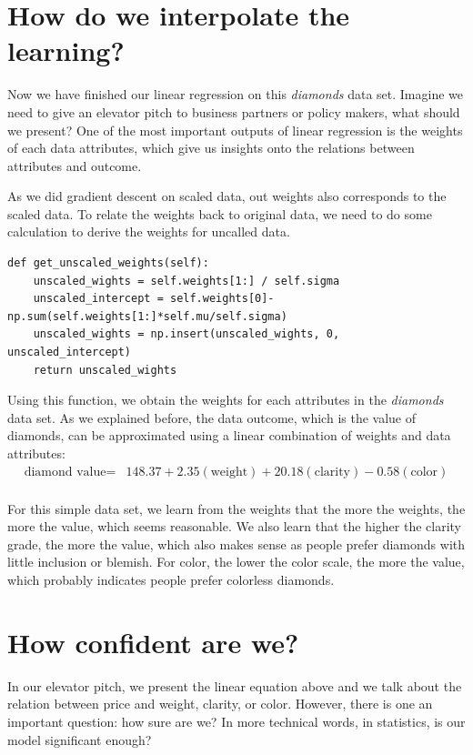 \documentclass[
	letterpaper
]{article}
\begin{document}
\section{How do we interpolate the learning?}
Now we have finished our linear regression on this \textit{diamonds} data set. 
Imagine we need to give an elevator pitch to business partners or policy makers, what should we present?
One of the most important outputs of linear regression is the weights of each data attributes, which give us insights onto the relations between attributes and outcome.

As we did gradient descent on scaled data, out weights also corresponds to the scaled data.
To relate the weights back to original data, we need to do some calculation to derive the weights for uncalled data.
\begin{lstlisting}
def get_unscaled_weights(self):
    unscaled_wights = self.weights[1:] / self.sigma
    unscaled_intercept = self.weights[0]-np.sum(self.weights[1:]*self.mu/self.sigma)
    unscaled_wights = np.insert(unscaled_wights, 0, unscaled_intercept)
    return unscaled_wights
\end{lstlisting}

Using this function, we obtain the weights for each attributes in the \textit{diamonds} data set.
As we explained before, the data outcome, which is the value of diamonds, can be approximated using a linear combination of weights and data attributes:
\begin{equation}
\begin{split}
\text{diamond value} = &148.37+ 2.35 (\text{weight}) + 20.18(\text{clarity})-0.58(\text{color}) \\
\end{split}
\end{equation}

For this simple data set, we learn from the weights that the more the weights, the more the value, which seems reasonable.
We also learn that the higher the clarity grade, the more the value, which also makes sense as people prefer diamonds with little inclusion or blemish.
For color, the lower the color scale, the more the value, which probably indicates people prefer colorless diamonds.

\section{How confident are we?}
In our elevator pitch, we present the linear equation above and we talk about the relation between price and weight, clarity, or color.
However, there is one an important question: how sure are we?
In more technical words, in statistics, is our model significant enough?
\end{document}
